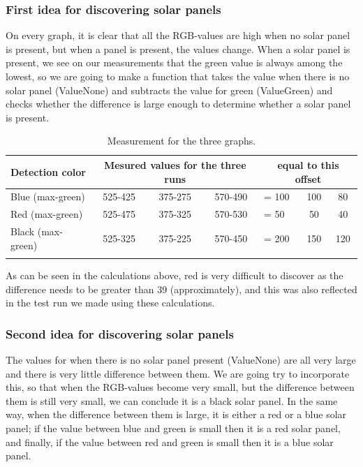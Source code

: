 \subsubsection{First idea for discovering solar panels}
On every graph, it is clear that all the RGB-values are high when no
solar panel is present, but when a panel is present, the values change.
When a solar panel is present, we see on our measurements that the green
value is always among the lowest, so we are going to make a function
that takes the value when there is no solar panel (ValueNone) and
subtracts the value for green (ValueGreen) and checks whether the
difference is large enough to determine whether a solar panel is
present.


\begin{longtable}[c]{|l|c|c|c|l|c|c|}
\hline
Detection color & 
\multicolumn{3}{c|}{Mesured values for the three runs} &
\multicolumn{3}{c|}{equal to this offset}\\\hline 
Blue (max-green) & 525-425 & 375-275 & 570-490 &= 100 & 100 & 80 \\
Red (max-green)  & 525-475 & 375-325 & 570-530 &=  50 &  50 & 40 \\
Black (max-green)& 525-325 & 375-225 & 570-450 &= 200 & 150 &120\\
\hline
\caption{Measurement for the three graphs.}
\end{longtable}


As can be seen in the calculations above, red is very difficult to
discover as the difference needs to be greater than 39 (approximately),
and this was also reflected in the test run we made using these
calculations.

\subsubsection{Second idea for discovering solar panels}

The values for when there is no solar panel present (ValueNone) are all
very large and there is very little difference between them. We are
going try to incorporate this, so that when the RGB-values become very
small, but the difference between them is still very small, we can
conclude it is a black solar panel. In the same way, when the difference
between them is large, it is either a red or a blue solar panel; if the value between blue and green is small then it is a red solar panel, and finally, if the value between red and green is small then it is a blue solar panel.

